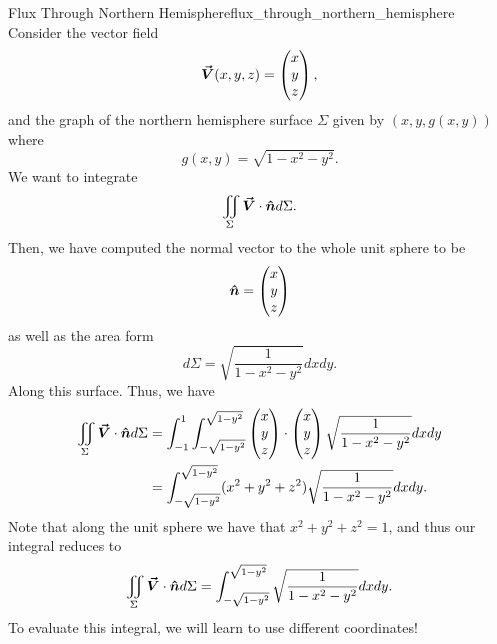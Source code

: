                                    	\begin{ex}{Flux Through Northern Hemisphere}{flux_through_northern_hemisphere}
                                   		Consider the vector field
                                   		\[
                                   		\boldsymbol{\vec{V}}(x,y,z) = \begin{pmatrix}  x\\ y \\ z \end{pmatrix},
                                   		\]
                                   		and the graph of the northern hemisphere surface $\Sigma$ given by $(x,y,g(x,y))$ where 
                                   		\[
                                   		g(x,y) = \sqrt{1-x^2-y^2}.
                                   		\]
                                   		We want to integrate
                                   		\[
                                   		\iint_\Sigma \boldsymbol{\vec{V}} \cdot \boldsymbol{\hat{n}} d\Sigma.
                                   		\]
                                   		Then, we have computed the normal vector to the whole unit sphere to be
                                   		\[
                                   		\boldsymbol{\hat{n}} = \begin{pmatrix} x \\ y \\ z \end{pmatrix}
                                   		\]
                                   		as well as the area form
                                   		\[
                                   		d\Sigma = \sqrt{\frac{1}{1-x^2-y^2}}dxdy.
                                   		\]
                                   		Along this surface.  Thus, we have
                                   		\begin{align*}
                                   			\iint_\Sigma \boldsymbol{\vec{V}} \cdot \boldsymbol{\hat{n}} d\Sigma &= \int_{-1}^1 \int_{-\sqrt{1-y^2}}^{\sqrt{1-y^2}} \begin{pmatrix} x \\ y \\ z \end{pmatrix} \cdot \begin{pmatrix} x \\ y \\ z \end{pmatrix} \sqrt{\frac{1}{1-x^2-y^2}}dxdy\\
                                   			&= \int_{-\sqrt{1-y^2}}^{\sqrt{1-y^2}} (x^2+y^2+z^2) \sqrt{\frac{1}{1-x^2-y^2}}dxdy.
                                   		\end{align*}
                                   		Note that along the unit sphere we have that $x^2+y^2+z^2=1$, and thus our integral reduces to
                                   		\[
                                   		\iint_\Sigma \boldsymbol{\vec{V}} \cdot \boldsymbol{\hat{n}} d\Sigma =  \int_{-\sqrt{1-y^2}}^{\sqrt{1-y^2}} \sqrt{\frac{1}{1-x^2-y^2}}dxdy.
                                   		\]                                   	
                                   		To evaluate this integral, we will learn to use different coordinates!
                                   	\end{ex}           
                                   	
